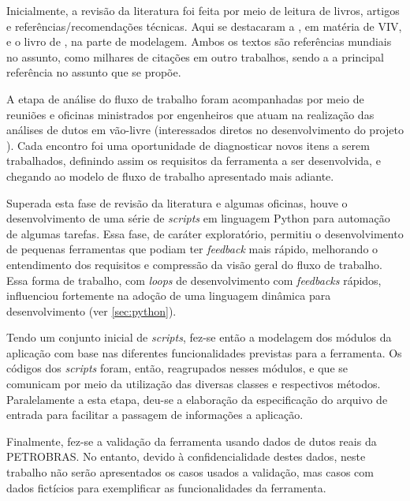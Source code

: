 Inicialmente, a revisão da literatura foi feita por meio de leitura de livros, artigos e referências/recomendações técnicas.
Aqui se destacaram a , em matéria de VIV, e o livro de , na parte de modelagem.
Ambos os textos são referências mundiais no assunto, como milhares de citações em outro trabalhos, sendo a  a principal referência no assunto que se propõe. %

A etapa de análise do fluxo de trabalho foram acompanhadas por meio de reuniões e oficinas ministrados por engenheiros que atuam na realização das análises de dutos em vão-livre (interessados diretos no desenvolvimento do projeto \integrispan).
Cada encontro foi uma oportunidade de diagnosticar novos itens a serem trabalhados, definindo assim os requisitos da ferramenta a ser desenvolvida, e chegando ao modelo de fluxo de trabalho apresentado mais adiante.

Superada esta fase de revisão da literatura e algumas oficinas, houve o desenvolvimento de uma série de \textit{scripts} em linguagem Python para automação de algumas tarefas.
Essa fase, de caráter exploratório, permitiu o desenvolvimento de pequenas ferramentas que podiam ter \textit{feedback} mais rápido, melhorando o entendimento dos requisitos e compressão da visão geral do fluxo de trabalho.
Essa forma de trabalho, com \textit{loops} de desenvolvimento com \textit{feedbacks} rápidos, influenciou fortemente na adoção de uma linguagem dinâmica para desenvolvimento (ver \autoref{sec:python}). %

Tendo um conjunto inicial de \textit{scripts}, fez-se então a modelagem dos módulos da aplicação com base nas diferentes funcionalidades previstas para a ferramenta.
Os códigos dos \textit{scripts} foram, então, reagrupados nesses módulos, e que se comunicam por meio da utilização das diversas classes e respectivos métodos.
Paralelamente a esta etapa, deu-se a elaboração da especificação do arquivo de entrada para facilitar a passagem de informações a aplicação. %

Finalmente, fez-se a validação da ferramenta usando dados de dutos reais da PETROBRAS\@.
No entanto, devido à confidencialidade destes dados, neste trabalho não serão apresentados os casos usados a validação, mas casos com dados fictícios para exemplificar as funcionalidades da ferramenta. %
